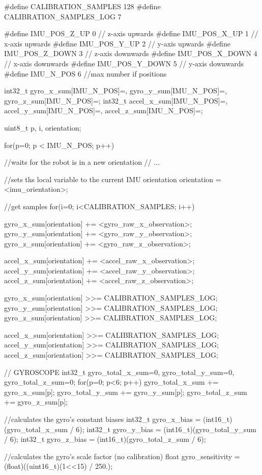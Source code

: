 \begin{ccode}
	#define CALIBRATION_SAMPLES	128
	#define CALIBRATION_SAMPLES_LOG	7

	#define IMU_POS_Z_UP 0 // z-axis upwards
	#define IMU_POS_X_UP 1 // x-axis upwards
	#define IMU_POS_Y_UP 2 // y-axis upwards
	#define IMU_POS_Z_DOWN 3 // z-axis downwards
	#define IMU_POS_X_DOWN 4 // x-axis downwards
	#define IMU_POS_Y_DOWN 5 // y-axis downwards
	#define IMU_N_POS 6 //max number if positions
	
	int32_t gyro_x_sum[IMU_N_POS]={}, gyro_y_sum[IMU_N_POS]={}, gyro_z_sum[IMU_N_POS]={};
	int32_t accel_x_sum[IMU_N_POS]={}, accel_y_sum[IMU_N_POS]={}, accel_z_sum[IMU_N_POS]={};
	
	uint8_t p, i, orientation;
	
	for(p=0; p < IMU_N_POS; p++) {
		//waits for the robot is in a new orientation
			// ...
		
		//sets ths local variable to the current IMU orientation
		orientation = <imu_orientation>;
			
		//get samples
		for(i=0; i<CALIBRATION_SAMPLES; i++) {	
			gyro_x_sum[orientation] += <gyro_raw_x_observation>;
			gyro_y_sum[orientation] += <gyro_raw_y_observation>;
			gyro_z_sum[orientation] += <gyro_raw_z_observation>;
			
			accel_x_sum[orientation] += <accel_raw_x_observation>;
			accel_y_sum[orientation] += <accel_raw_y_observation>;
			accel_z_sum[orientation] += <accel_raw_z_observation>;
		}

		gyro_x_sum[orientation] >>= CALIBRATION_SAMPLES_LOG;
		gyro_y_sum[orientation] >>= CALIBRATION_SAMPLES_LOG;
		gyro_z_sum[orientation] >>= CALIBRATION_SAMPLES_LOG;

		accel_x_sum[orientation] >>= CALIBRATION_SAMPLES_LOG;
		accel_y_sum[orientation] >>= CALIBRATION_SAMPLES_LOG;
		accel_z_sum[orientation] >>= CALIBRATION_SAMPLES_LOG;
	}
	
	// GYROSCOPE
	int32_t gyro_total_x_sum=0, gyro_total_y_sum=0, gyro_total_z_sum=0;
	for(p=0; p<6; p++) {
		gyro_total_x_sum += gyro_x_sum[p];
		gyro_total_y_sum += gyro_y_sum[p];
		gyro_total_z_sum += gyro_z_sum[p];
	}
	
		//calculates the gyro's constant biases
	int32_t gyro_x_bias = (int16_t)(gyro_total_x_sum / 6);
	int32_t gyro_y_bias = (int16_t)(gyro_total_y_sum / 6);
	int32_t gyro_z_bias = (int16_t)(gyro_total_z_sum / 6);
	
		//calculates the gyro's scale factor (no calibration)
	float gyro_sensitivity = (float)((uint16_t)(1<<15) / 250.);


\end{ccode}
